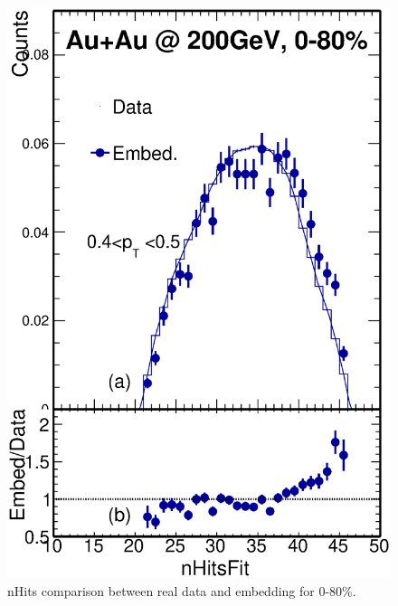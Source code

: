 \begin{figure}[htbp]
\begin{minipage}[htbp]{0.45\linewidth}
\centering
\includegraphics[width=1.0\textwidth,angle=0]{figure/Run14_D0HFT/nHitsFit11_2.eps}
\caption{ nHits comparison between real data and embedding for 0-80\%. \label{nHits_0_80_2}}
\end{minipage}
\hfill
\begin{minipage}[htbp]{0.45\linewidth}
\centering

\end{minipage}
\end{figure}
